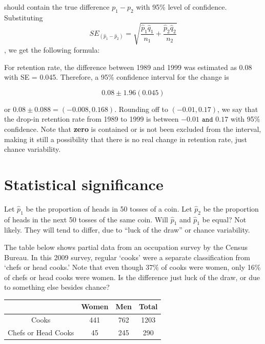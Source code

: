 \documentclass[11pt, chapterprefix=true]{scrbook}\usepackage[]{graphicx}\usepackage[]{color}
\begin{document}
should contain the true difference $p_1 - p_2$ with 95\% level of confidence.  Substituting
$$ SE_{( \hat{p}_1 - \hat{p}_2)} = \sqrt{ \frac{ \hat{p}_1 \hat{q}_1}{n_1} + \frac{ \hat{p}_2 \hat{q}_2}{n_2}} $$,
we get the following formula:

\begin{center}
\end{center}

For retention rate, the difference between 1989 and 1999 was estimated as 0.08 with SE = 0.045.  Therefore, a 95\% confidence interval for the change is

\begin{equation*}
0.08 \pm 1.96 (0.045)
\end{equation*}

or $0.08 \pm 0.088 = (-0.008, 0.168)$.  Rounding off to $(-0.01, 0.17)$, we say that the drop-in retention rate from 1989 to 1999 is between $-0.01 \texttt{ and } 0.17$ with 95\% confidence. Note that \textbf{zero} is contained or is not been excluded from the interval, making it still a possibility that there is no real change in retention rate, just chance variability.

\section{Statistical significance}

Let $\hat{p}_1$ be the proportion of heads in 50 tosses of a coin.  Let $\hat{p}_2$  be the proportion of heads in the next 50 tosses of the same coin.  Will $\hat{p}_1$  and $\hat{p}_1$ be equal?  Not likely.  They will tend to differ, due to ``luck of the draw'' or chance variability.

The table below shows partial data from an occupation survey by the Census Bureau. In this 2009 survey, regular `cooks' were a separate classification from `chefs or head cooks.'  Note that even though 37\% of cooks were women, only 16\% of chefs or head cooks were women.  Is the difference just luck of the draw, or due to something else besides chance?

\begin{table}[ht]
\centering
\begin{tabular}{@{} cccc @{}} \hline
       & Women & Men & Total \\ \hline
Cooks & 441 & 762 & 1203 \\
Chefs or Head Cooks & 45 & 245 & 290 \\ \hline
\end{tabular}
\end{table}
\end{document}
